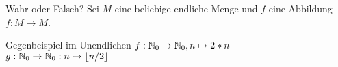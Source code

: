 \begin{frame}
	\begin{block}{Wahr oder Falsch?}
		Sei $M$ eine beliebige endliche Menge und $f$ eine Abbildung $f : M \to M$.
		\begin{itemize}
		\end{itemize}
	\end{block}

	\pause[5]
	\begin{block}{Gegenbeispiel im Unendlichen}
		$f : \mathbb{N}_0 \to \mathbb{N}_0, n \mapsto 2 * n $\\ 
		$g : \mathbb{N}_0 \to \mathbb{N}_0: n \mapsto \lfloor n/2 \rfloor$
	\end{block}
	
\end{frame}